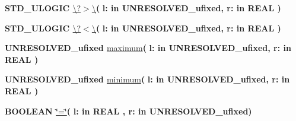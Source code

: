 \begin{DoxyCompactItemize}
\item 
{\bfseries {\bfseries \textcolor{comment}{S\+T\+D\+\_\+\+U\+L\+O\+G\+I\+C}\textcolor{vhdlchar}{ }}} \hyperlink{class__fixed__pkg_a9e6b6b8c2c14da978e6f70cb6e85e6dc}{\textbackslash{}?$>$\textbackslash{}}{\bfseries  ( }{\bfseries \textcolor{vhdlchar}{l\+: }\textcolor{stringliteral}{in }\textcolor{vhdlchar}{U\+N\+R\+E\+S\+O\+L\+V\+E\+D\+\_\+ufixed}}{\bfseries  , \textcolor{vhdlchar}{r\+: }\textcolor{stringliteral}{in }{\bfseries \textcolor{comment}{R\+E\+A\+L}\textcolor{vhdlchar}{ }}}{\bfseries  )} 
\item 
{\bfseries {\bfseries \textcolor{comment}{S\+T\+D\+\_\+\+U\+L\+O\+G\+I\+C}\textcolor{vhdlchar}{ }}} \hyperlink{class__fixed__pkg_a7e98e66a4a282c529968f69f70dd16ad}{\textbackslash{}?$<$\textbackslash{}}{\bfseries  ( }{\bfseries \textcolor{vhdlchar}{l\+: }\textcolor{stringliteral}{in }\textcolor{vhdlchar}{U\+N\+R\+E\+S\+O\+L\+V\+E\+D\+\_\+ufixed}}{\bfseries  , \textcolor{vhdlchar}{r\+: }\textcolor{stringliteral}{in }{\bfseries \textcolor{comment}{R\+E\+A\+L}\textcolor{vhdlchar}{ }}}{\bfseries  )} 
\item 
{\bfseries {\bfseries \textcolor{vhdlchar}{U\+N\+R\+E\+S\+O\+L\+V\+E\+D\+\_\+ufixed}\textcolor{vhdlchar}{ }}} \hyperlink{class__fixed__pkg_a8e1abbe4534fa7d5dea9fee275da3723}{maximum}{\bfseries  ( }{\bfseries \textcolor{vhdlchar}{l\+: }\textcolor{stringliteral}{in }\textcolor{vhdlchar}{U\+N\+R\+E\+S\+O\+L\+V\+E\+D\+\_\+ufixed}}{\bfseries  , \textcolor{vhdlchar}{r\+: }\textcolor{stringliteral}{in }{\bfseries \textcolor{comment}{R\+E\+A\+L}\textcolor{vhdlchar}{ }}}{\bfseries  )} 
\item 
{\bfseries {\bfseries \textcolor{vhdlchar}{U\+N\+R\+E\+S\+O\+L\+V\+E\+D\+\_\+ufixed}\textcolor{vhdlchar}{ }}} \hyperlink{class__fixed__pkg_ae6f8be7af801cf9cb3dcc7b877059955}{minimum}{\bfseries  ( }{\bfseries \textcolor{vhdlchar}{l\+: }\textcolor{stringliteral}{in }\textcolor{vhdlchar}{U\+N\+R\+E\+S\+O\+L\+V\+E\+D\+\_\+ufixed}}{\bfseries  , \textcolor{vhdlchar}{r\+: }\textcolor{stringliteral}{in }{\bfseries \textcolor{comment}{R\+E\+A\+L}\textcolor{vhdlchar}{ }}}{\bfseries  )} 
\item 
{\bfseries {\bfseries \textcolor{comment}{B\+O\+O\+L\+E\+A\+N}\textcolor{vhdlchar}{ }}} \hyperlink{class__fixed__pkg_a7949e9258ea0749e3b35961feea8db87}{\char`\"{}=\char`\"{}}{\bfseries  ( }{\bfseries \textcolor{vhdlchar}{l\+: }\textcolor{stringliteral}{in }{\bfseries \textcolor{comment}{R\+E\+A\+L}\textcolor{vhdlchar}{ }}}{\bfseries  , \textcolor{vhdlchar}{r\+: }\textcolor{stringliteral}{in }\textcolor{vhdlchar}{U\+N\+R\+E\+S\+O\+L\+V\+E\+D\+\_\+ufixed}}{\bfseries  )} 

\end{DoxyCompactItemize}
